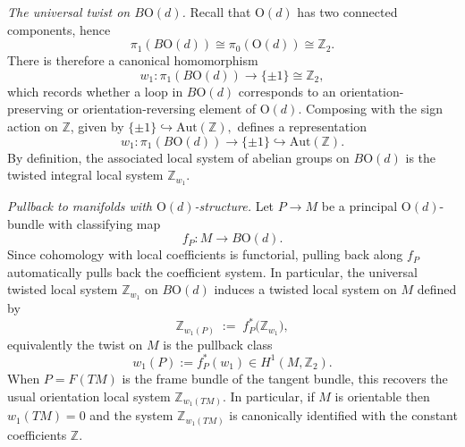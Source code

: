 \documentclass[aps,prx,reprint,superscriptaddress,twocolumn,amsmath,amssymb,amsfonts, nofootinbib]{revtex4-2}
\newcommand{\Z}{\mathbb{Z}}
\theoremstyle{apsstyle}
\begin{document}
\bigskip

\noindent \textit{The universal twist on $B\mathrm{O}(d)$.}
Recall that $\mathrm{O}(d)$ has two connected components, hence
\begin{equation*}
    \pi_{1}(B\mathrm{O}(d))\cong \pi_{0}(\mathrm{O}(d))\cong \Z_{2}.
\end{equation*}
There is therefore a canonical homomorphism
\begin{equation}
\label{eq:w1_pi1}
    w_{1}:\pi_{1}(B\mathrm{O}(d))\longrightarrow \{\pm 1\}\cong \Z_{2},
\end{equation}
which records whether a loop in $B\mathrm{O}(d)$ corresponds to an orientation-preserving or orientation-reversing element of $\mathrm{O}(d)$. Composing with the sign action on $\Z$, given by $\{\pm 1\}\hookrightarrow \mathrm{Aut}(\Z),$ defines a representation \begin{equation}
\label{eq:sign_coeff}
w_{1}:\pi_{1}(B\mathrm{O}(d))\to \{\pm 1\} \hookrightarrow \mathrm{Aut}(\Z).
\end{equation} 
By definition, the associated local system of abelian groups on $B\mathrm{O}(d)$ is the twisted integral local system $\Z_{w_{1}}$. 

\bigskip

\noindent \textit{Pullback to manifolds with $\mathrm{O}(d)$-structure.}
Let $P\to M$ be a principal $\mathrm{O}(d)$-bundle with classifying map
\begin{equation}
\label{eq:classifying_map_O}
    f_{P}:M\longrightarrow B\mathrm{O}(d).
\end{equation}
Since cohomology with local coefficients is functorial, pulling back along $f_{P}$ automatically
pulls back the coefficient system. In particular, the universal twisted local system
$\Z_{w_{1}}$ on $B\mathrm{O}(d)$ induces a twisted local system on $M$ defined by
\begin{equation}
\label{eq:pullback_local_system}
    \Z_{w_{1}(P)} \;:=\; f_{P}^{*}\big(\Z_{w_{1}}\big),
\end{equation}
equivalently the twist on $M$ is the pullback class
\begin{equation*}
    w_{1}(P):=f_{P}^{*}(w_{1})\in H^{1}(M,\Z_{2}).
\end{equation*}
When $P=F(TM)$ is the frame bundle of the tangent bundle, this recovers the usual orientation local system $\Z_{w_{1}(TM)}$. In particular, if $M$ is orientable then $w_{1}(TM)=0$ and the system $\Z_{w_{1}(TM)}$ is canonically identified with the constant coefficients $\Z$.
\end{document}
